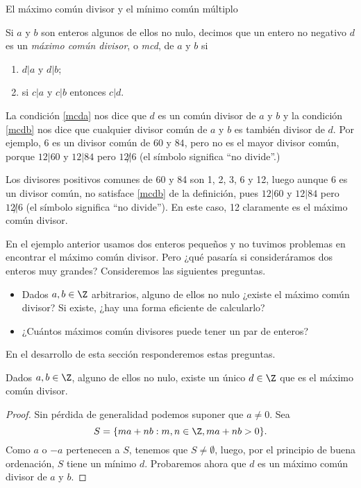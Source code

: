 \begin{section}{El máximo común divisor y el mínimo común
múltiplo}\label{1.7}

\begin{definicion}\label{mcd} Si $a$ y $b$ son enteros algunos de ellos no nulo, decimos que un entero no negativo $d$ es un \textit{máximo común divisor}, o \textit{mcd}, de $a$ y $b$ si
\begin{enumerate}[label=\textit{\alph*)}]
\item\label{mcda} $ d|a$  y $d|b$;
\item\label{mcdb}  si $ c|a $ y $c|b$ entonces $ c|d$.
\end{enumerate}
\end{definicion}
La condición \ref{mcda} nos dice que $d$ es un común divisor de $a$ y $b$ y la condición \ref{mcdb} nos dice que cualquier divisor común de
$a$ y $b$ es también divisor de $d$. Por ejemplo, $6$ es un divisor común de $60$ y $84$, pero no es el mayor divisor común, porque
$12|60$ y $12|84$ pero $12{\not|}6$ (el símbolo significa ``no divide''.)



\begin{ejemplo} \label{ejem-1-mcd}
    Los divisores positivos comunes de 60  y 84 son 1, 2, 3, 6 y 12, luego aunque 6  es un divisor común, no satisface \ref{mcdb} de la definición, pues $12|60$ y $12|84$ pero $12{\not|}6$ (el símbolo significa ``no divide''). En este caso, 12  claramente es  el  máximo común divisor.
\end{ejemplo}

En el ejemplo anterior usamos dos enteros pequeños y no tuvimos problemas en encontrar el  máximo común divisor. Pero ¿qué pasaría si consideráramos dos enteros muy grandes? Consideremos las siguientes preguntas.
\begin{itemize}
    \item Dados $a,b \in \Z$ arbitrarios, alguno de ellos no nulo ¿existe el máximo común divisor? Si existe, ¿hay una forma eficiente de calcularlo?
    \item  ¿Cuántos máximos común divisores puede tener un  par de enteros?
\end{itemize}
En  el desarrollo de esta sección responderemos estas preguntas. 


\begin{teorema}
    Dados $a,b \in \Z$, alguno de ellos no nulo, existe un único $d \in \Z$ que es el máximo común divisor. 
\end{teorema}
\begin{proof}
    Sin pérdida de generalidad podemos suponer que  $a \ne 0$. Sea 
    \begin{equation*}
    S = \{m a+n b : m,n\in \Z, m a+n b>0\}.
    \end{equation*}
    Como  $a$ o $-a$ pertenecen a $S$, tenemos que  $S \not= \emptyset$, luego, por el principio de buena ordenación, $S$ tiene un  mínimo $d$. Probaremos ahora que  $d$  es un  máximo común divisor de $a$ y $b$. 
    

\end{proof}
\end{section}
